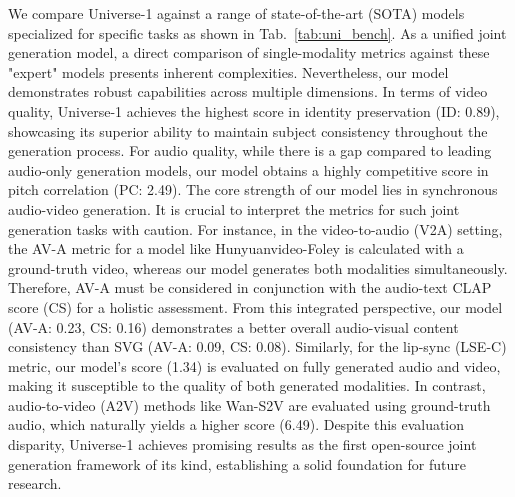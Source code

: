 We compare Universe-1 against a range of state-of-the-art (SOTA) models specialized for specific tasks as shown in Tab.~\ref{tab:uni_bench}. As a unified joint generation model, a direct comparison of single-modality metrics against these "expert" models presents inherent complexities. Nevertheless, our model demonstrates robust capabilities across multiple dimensions.
In terms of video quality, Universe-1 achieves the highest score in identity preservation (ID: 0.89), showcasing its superior ability to maintain subject consistency throughout the generation process. For audio quality, while there is a gap compared to leading audio-only generation models, our model obtains a highly competitive score in pitch correlation (PC: 2.49).
The core strength of our model lies in synchronous audio-video generation. It is crucial to interpret the metrics for such joint generation tasks with caution. For instance, in the video-to-audio (V2A) setting, the AV-A metric for a model like Hunyuanvideo-Foley is calculated with a ground-truth video, whereas our model generates both modalities simultaneously. Therefore, AV-A must be considered in conjunction with the audio-text CLAP score (CS) for a holistic assessment. From this integrated perspective, our model (AV-A: 0.23, CS: 0.16) demonstrates a better overall audio-visual content consistency than SVG (AV-A: 0.09, CS: 0.08).
Similarly, for the lip-sync (LSE-C) metric, our model's score (1.34) is evaluated on fully generated audio and video, making it susceptible to the quality of both generated modalities. In contrast, audio-to-video (A2V) methods like Wan-S2V are evaluated using ground-truth audio, which naturally yields a higher score (6.49). Despite this evaluation disparity, Universe-1 achieves promising results as the first open-source joint generation framework of its kind, establishing a solid foundation for future research.

